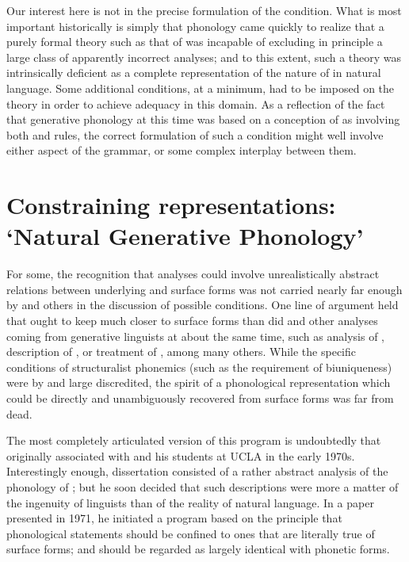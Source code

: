 Our interest here is not in the precise formulation of the 
condition. What is most important historically is simply that
phonology came quickly to realize that a purely formal theory such as
that of \textsl{} was incapable of excluding in principle a large class of
apparently incorrect analyses; and to this extent, such a theory was
intrinsically deficient as a complete representation of the nature of
 in natural language. Some additional conditions, at a
minimum, had to be imposed on the theory in order to achieve adequacy
in this domain. As a reflection of the fact that generative phonology
at this time was based on a conception of  as involving
both  and rules, the correct formulation of such a
condition might well involve either aspect of the grammar, or some
complex interplay between them.

\section{Constraining representations: `Natural Generative Phonology'}
\label{sec:ngp}

For some, the recognition that \textsl{} analyses could involve
unrealistically abstract relations between underlying and surface
forms was not carried nearly far enough by {\Kiparsky} and others in the
discussion of possible  conditions. One line of argument
held that  ought to keep much closer to
surface forms than did \textsl{} and other analyses coming from
generative linguists at about the same time, such as
 analysis of ,
 description of ,
 or  treatment of
, among many others. While the specific conditions of
structuralist phonemics (such as the requirement of biuniqueness) were
by and large discredited, the spirit of a phonological representation
which could be directly and unambiguously recovered from surface forms
was far from dead.

The most completely articulated version of this program is undoubtedly
that originally associated with  and his students at
UCLA in the early 1970s. Interestingly enough,
 dissertation consisted of a rather
abstract analysis of the phonology of ; but he soon decided that
such descriptions were more a matter of the ingenuity of linguists
than of the reality of natural language. In a paper presented in 1971,
he initiated a program based on the principle that phonological
statements should be confined to ones that are literally true of
surface forms; and  should be regarded as
largely identical with phonetic forms.

